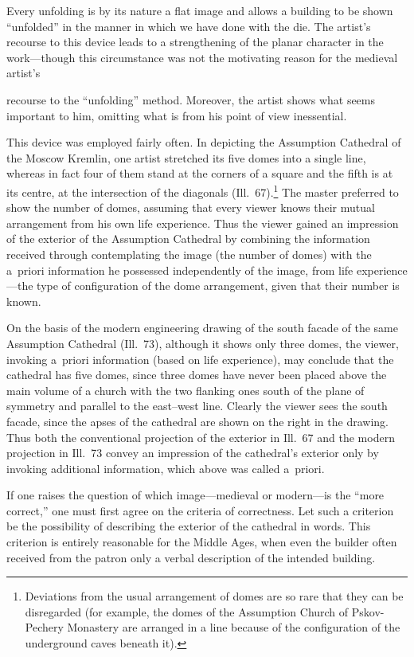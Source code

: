 Every unfolding is by its nature a flat image and allows a building to be shown
``unfolded'' in the manner in which we have done with the die.  The artist's recourse to
this device leads to a strengthening of the planar character in the work---though this
circumstance was not the motivating reason for the medieval artist's


recourse to the ``unfolding'' method.  Moreover, the artist shows what seems important to
him, omitting what is from his point of view inessential.

This device was employed fairly often.  In depicting the Assumption Cathedral of the
Moscow Kremlin, one artist stretched its five domes into a single line, whereas in fact
four of them stand at the corners of a square and the fifth is at its centre, at the
intersection of the diagonals (Ill.~67).\footnote{Deviations from the usual arrangement
  of domes are so rare that they can be disregarded (for example, the domes of the
  Assumption Church of Pskov-Pechery Monastery are arranged in a line because of the
  configuration of the underground caves beneath it).}  The master preferred to show the
number of domes, assuming that every viewer knows their mutual arrangement from his own
life experience.  Thus the viewer gained an impression of the exterior of the Assumption
Cathedral by combining the information received through contemplating the image (the
number of domes) with the a~priori information he possessed independently of the image,
from life experience---the type of configuration of the dome arrangement, given that their
number is known.

On the basis of the modern engineering drawing of the south facade of the same Assumption
Cathedral (Ill.~73), although it shows only three domes, the viewer, invoking a~priori
information (based on life experience), may conclude that the cathedral has five domes,
since three domes have never been placed above the main volume of a church with the two
flanking ones south of the plane of symmetry and parallel to the east--west line.  Clearly
the viewer sees the south facade, since the apses of the cathedral are shown on the right
in the drawing.  Thus both the conventional projection of the exterior in Ill.~67 and
the modern projection in Ill.~73 convey an impression of the cathedral's exterior only
by invoking additional information, which above was called a~priori.

If one raises the question of which image---medieval or modern---is the ``more correct,''
one must first agree on the criteria of correctness.  Let such a criterion be the
possibility of describing the exterior of the cathedral in words.  This criterion is
entirely reasonable for the Middle Ages, when even the builder often received from the
patron only a verbal description of the intended building.

